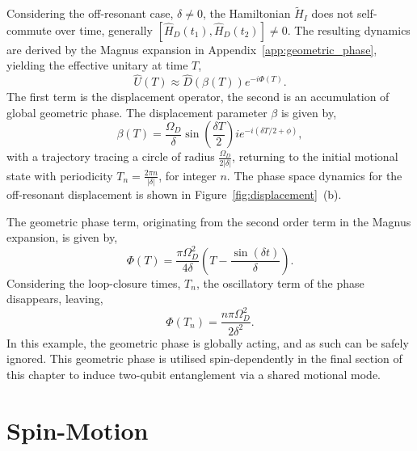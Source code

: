 Considering the off-resonant case, $\delta \neq 0$, the Hamiltonian $\tilde H_I$ 
does not self-commute over time, generally $[\hat H_D(t_1), \hat H_D(t_2)]\neq 0$. The resulting dynamics are derived by the Magnus expansion in Appendix~\ref{app:geometric_phase}, yielding the effective unitary at time $T$,
\begin{equation}
    \label{eqn:displacement}
    \hat U(T) \approx \hat D(\beta(T))e^{-i\Phi(T)}.
\end{equation}
The first term is the displacement operator, the second is an accumulation of global geometric phase.
The displacement parameter $\beta$ is given by,
\begin{equation}
    \label{eqn:beta}
    \beta(T) = \frac{\Omega_D}{\delta}\sin\left(\frac{\delta T}{2}\right)ie^{-i(\delta T/2 + \phi)},
\end{equation}
with a trajectory tracing a circle of radius $\frac{\Omega_D}{2|\delta|}$, returning to the
initial motional state with periodicity $T_n = \frac{2\pi n}{|\delta|}$, for integer $n$.
The phase space dynamics for the off-resonant displacement is shown in Figure~\ref{fig:displacement}~(b).

The geometric phase term, originating from the second
order term in the Magnus expansion, is given by,
\begin{equation}
    \label{eqn:phi}
    \Phi(T) = \frac{\pi\Omega_D^2}{4\delta}\left(T-\frac{\sin(\delta t)}{\delta}\right).
\end{equation}
Considering the loop-closure times, $T_n$, the oscillatory term of the phase disappears, leaving,
\begin{equation}
    \Phi(T_n) = \frac{n\pi\Omega_D^2}{2\delta^2}.
\end{equation}
In this example, the geometric phase is globally acting, and as such can be safely ignored. This geometric phase is utilised spin-dependently in the final section of this chapter to induce two-qubit entanglement via a shared motional mode.

\section{Spin-Motion}
\label{sec:Motional Coupling}


